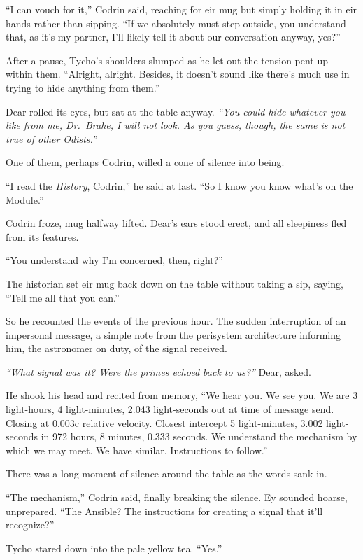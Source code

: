 ``I can vouch for it,'' Codrin said, reaching for eir mug but simply holding it in eir hands rather than sipping. ``If we absolutely must step outside, you understand that, as it's my partner, I'll likely tell it about our conversation anyway, yes?''

After a pause, Tycho's shoulders slumped as he let out the tension pent up within them. ``Alright, alright. Besides, it doesn't sound like there's much use in trying to hide anything from them.''

Dear rolled its eyes, but sat at the table anyway. \emph{``You could hide whatever you like from me, Dr.~Brahe, I will not look. As you guess, though, the same is not true of other Odists.''}

One of them, perhaps Codrin, willed a cone of silence into being.

``I read the \emph{History}, Codrin,'' he said at last. ``So I know you know what's on the Module.''

Codrin froze, mug halfway lifted. Dear's ears stood erect, and all sleepiness fled from its features.

``You understand why I'm concerned, then, right?''

The historian set eir mug back down on the table without taking a sip, saying, ``Tell me all that you can.''

So he recounted the events of the previous hour. The sudden interruption of an impersonal message, a simple note from the perisystem architecture informing him, the astronomer on duty, of the signal received.

\emph{``What signal was it? Were the primes echoed back to us?''} Dear, asked.

He shook his head and recited from memory, ``We hear you. We see you. We are 3 light-hours, 4 light-minutes, 2.043 light-seconds out at time of message send. Closing at 0.003c relative velocity. Closest intercept 5 light-minutes, 3.002 light-seconds in 972 hours, 8 minutes, 0.333 seconds. We understand the mechanism by which we may meet. We have similar. Instructions to follow.''

There was a long moment of silence around the table as the words sank in.

``The mechanism,'' Codrin said, finally breaking the silence. Ey sounded hoarse, unprepared. ``The Ansible? The instructions for creating a signal that it'll recognize?''

Tycho stared down into the pale yellow tea. ``Yes.''

